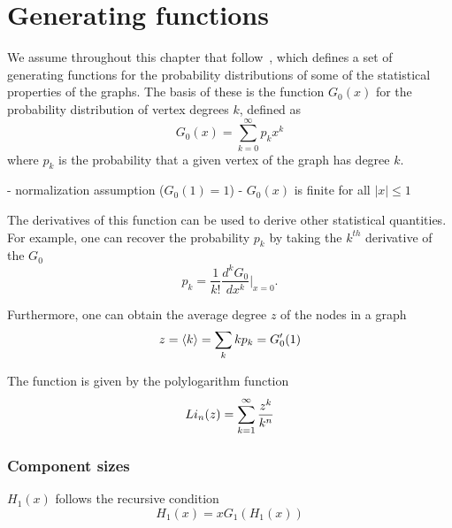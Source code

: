 




\section{Generating functions} %
\label{sec:generating_functions}



We assume throughout this chapter that  follow~\cite{Newman:zFi032Kd}, which defines a set of generating functions for the probability distributions of some of the statistical properties of the graphs.
The basis of these is the function $G_0(x)$ for the probability distribution of vertex degrees $k$, defined as
\begin{equation}
G_0(x) = \sum_{k=0}^{\infty} p_k x^k
\end{equation}
where $p_k$ is the probability that a given vertex of the graph has degree $k$.

- normalization assumption ($G_0(1) = 1$)
- $G_0(x)$ is finite for all $|x| \le 1$

The derivatives of this function can be used to derive other statistical quantities.
For example, one can recover the probability $p_k$ by taking the $k^{th}$ derivative of the $G_0$
\begin{equation}
	p_k = \frac{1}{k!} \frac{d^k G_0}{dx^k} \Big|_{x=0}.
\end{equation}

Furthermore, one can obtain the average degree $z$ of the nodes in a graph 
\begin{equation}
	z = \left< k \right> = \sum_k k p_k = G'_0(1)
\end{equation}

The function is given by the polylogarithm function
\begin{equation}
	Li_{n} ({z}) = \sum_{k=1}^{\infty} \frac{z^k}{k^n}
\end{equation}

\subsubsection{Component sizes} %
\label{ssub:component_sizes}

$H_1(x)$ follows the recursive condition
\begin{equation}
	H_1(x) = x G_1( H_1(x))
\end{equation}








